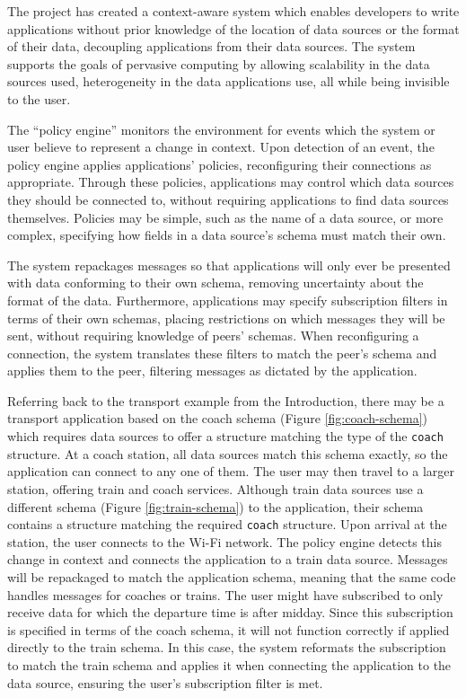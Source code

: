 \documentclass[12pt,twoside,notitlepage]{report}
\begin{document}
The project has created a context-aware system which enables developers to write applications without prior knowledge of the location of data sources or the format of their data, decoupling applications from their data sources. 
The system supports the goals of pervasive computing by allowing scalability in the data sources used, heterogeneity in the data applications use, all while being invisible to the user.

The ``policy engine'' monitors the environment for events which the system or user believe to represent a change in context.
Upon detection of an event, the policy engine applies applications' policies, reconfiguring their connections as appropriate. 
Through these policies, applications may control which data sources they should be connected to, without requiring applications to find data sources themselves.
Policies may be simple, such as the name of a data source, or more complex, specifying how fields in a data source's schema must match their own. 

The system repackages messages so that applications will only ever be presented with data conforming to their own schema, removing uncertainty about the format of the data.
Furthermore, applications may specify subscription filters in terms of their own schemas, placing restrictions on which messages they will be sent, without requiring knowledge of peers' schemas.
When reconfiguring a connection, the system translates these filters to match the peer's schema and applies them to the peer, filtering messages as dictated by the application.

Referring back to the transport example from the Introduction, there may be a transport application based on the coach schema (Figure \ref{fig:coach-schema}) which requires data sources to offer a structure matching the type of the {\tt coach} structure. 
At a coach station, all data sources match this schema exactly, so the application can connect to any one of them. 
The user may then travel to a larger station, offering train and coach services. 
Although train data sources use a different schema (Figure \ref{fig:train-schema}) to the application, their schema contains a structure matching the required {\tt coach} structure.
Upon arrival at the station, the user connects to the Wi-Fi network. The policy engine detects this change in context and connects the application to a train data source. 
Messages will be repackaged to match the application schema, meaning that the same code handles messages for coaches or trains.
The user might have subscribed to only receive data for which the departure time is after midday. 
Since this subscription is specified in terms of the coach schema, it will not function correctly if applied directly to the train schema. 
In this case, the system reformats the subscription to match the train schema and applies it when connecting the application to the data source, ensuring the user's subscription filter is met.
\end{document}

